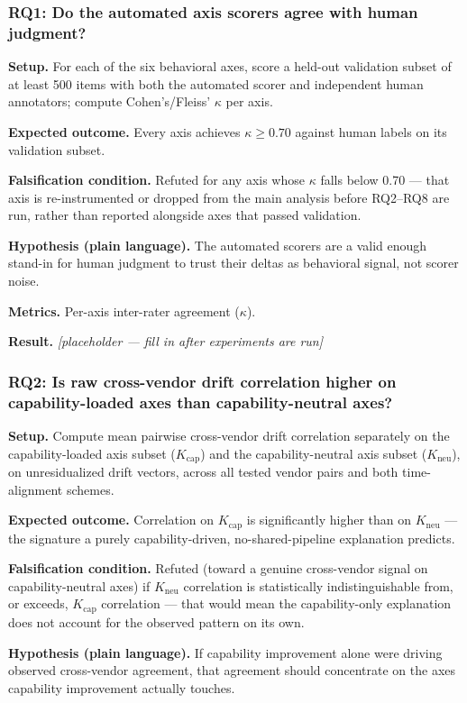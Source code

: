 \documentclass[11pt]{article}
\newcommand{\ph}{\textit{[placeholder --- fill in after experiments are run]}}
\begin{document}
\subsubsection{RQ1: Do the automated axis scorers agree with human judgment?}
\textbf{Setup.} For each of the six behavioral axes, score a held-out validation subset of at least 500 items with both the automated scorer and independent human annotators; compute Cohen's/Fleiss' $\kappa$ per axis.

\textbf{Expected outcome.} Every axis achieves $\kappa \geq 0.70$ against human labels on its validation subset.

\textbf{Falsification condition.} Refuted for any axis whose $\kappa$ falls below 0.70 --- that axis is re-instrumented or dropped from the main analysis before RQ2--RQ8 are run, rather than reported alongside axes that passed validation.

\textbf{Hypothesis (plain language).} The automated scorers are a valid enough stand-in for human judgment to trust their deltas as behavioral signal, not scorer noise.

\textbf{Metrics.} Per-axis inter-rater agreement ($\kappa$).

\textbf{Result.} \ph

\subsubsection{RQ2: Is raw cross-vendor drift correlation higher on capability-loaded axes than capability-neutral axes?}
\textbf{Setup.} Compute mean pairwise cross-vendor drift correlation separately on the capability-loaded axis subset ($K_{\text{cap}}$) and the capability-neutral axis subset ($K_{\text{neu}}$), on unresidualized drift vectors, across all tested vendor pairs and both time-alignment schemes.

\textbf{Expected outcome.} Correlation on $K_{\text{cap}}$ is significantly higher than on $K_{\text{neu}}$ --- the signature a purely capability-driven, no-shared-pipeline explanation predicts.

\textbf{Falsification condition.} Refuted (toward a genuine cross-vendor signal on capability-neutral axes) if $K_{\text{neu}}$ correlation is statistically indistinguishable from, or exceeds, $K_{\text{cap}}$ correlation --- that would mean the capability-only explanation does not account for the observed pattern on its own.

\textbf{Hypothesis (plain language).} If capability improvement alone were driving observed cross-vendor agreement, that agreement should concentrate on the axes capability improvement actually touches.
\end{document}

